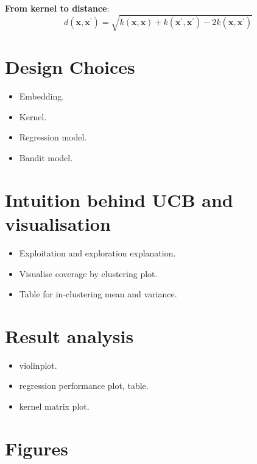 \textbf{From kernel to distance}:
$$d(\mathbf{x}, \mathbf{x}^\prime) = \sqrt{k(\mathbf{x}, \mathbf{x}) + k(\mathbf{x}^\prime, \mathbf{x}^\prime) - 2 k(\mathbf{x}, \mathbf{x}^\prime)} $$

\section{Design Choices}

\begin{itemize}
    \item Embedding.
    \item Kernel.
    \item Regression model.
    \item Bandit model.
\end{itemize}

\section{Intuition behind UCB and visualisation}

\begin{itemize}
    \item Exploitation and exploration explanation.
    \item Visualise coverage by clustering plot.
    \item Table for in-clustering mean and variance.
\end{itemize}

\section{Result analysis}

\begin{itemize}
    \item violinplot.
    \item regression performance plot, table.
    \item kernel matrix plot.
\end{itemize}

\section{Figures}




